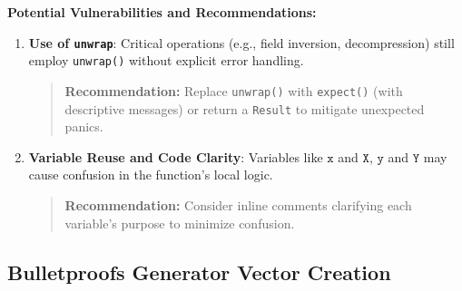 \documentclass[12pt,a4paper]{article}
\begin{document}
\textbf{Potential Vulnerabilities and Recommendations:}
\begin{enumerate}
    \item \textbf{Use of \texttt{unwrap}}: Critical operations (e.g., field inversion, decompression) still employ \texttt{unwrap()} without explicit error handling.\
    \begin{quote}
     \textbf{Recommendation:} Replace \texttt{unwrap()} with \texttt{expect()} (with descriptive messages) or return a \texttt{Result} to mitigate unexpected panics.
    \end{quote}


    \item \textbf{Variable Reuse and Code Clarity}: Variables like \(\texttt{x}\) and \(\texttt{X}\), \(\texttt{y}\) and \(\texttt{Y}\) may cause confusion in the function’s local logic.
    \begin{quote}
     \textbf{Recommendation:} Consider inline comments clarifying each variable’s purpose to minimize confusion.
    \end{quote}
\end{enumerate}

\subsection{Bulletproofs Generator Vector Creation}
\end{document}
